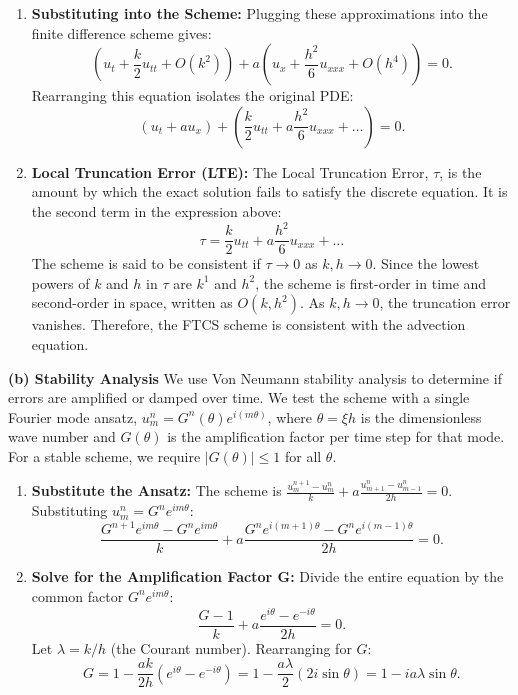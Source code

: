 \begin{solution}
\begin{enumerate}
    \item \textbf{Substituting into the Scheme:}
    Plugging these approximations into the finite difference scheme gives:
    \[ \left( u_t + \frac{k}{2} u_{tt} + O(k^2) \right) + a \left( u_x + \frac{h^2}{6} u_{xxx} + O(h^4) \right) = 0. \]
    Rearranging this equation isolates the original PDE:
    \[ (u_t + a u_x) + \left( \frac{k}{2} u_{tt} + a \frac{h^2}{6} u_{xxx} + \dots \right) = 0. \]
    
    \item \textbf{Local Truncation Error (LTE):}
    The Local Truncation Error, $\tau$, is the amount by which the exact solution fails to satisfy the discrete equation. It is the second term in the expression above:
    \[ \tau = \frac{k}{2} u_{tt} + a \frac{h^2}{6} u_{xxx} + \dots \]
    The scheme is said to be consistent if $\tau \to 0$ as $k, h \to 0$. Since the lowest powers of $k$ and $h$ in $\tau$ are $k^1$ and $h^2$, the scheme is first-order in time and second-order in space, written as $O(k, h^2)$. As $k,h \to 0$, the truncation error vanishes. Therefore, the FTCS scheme is consistent with the advection equation.
\end{enumerate}

\textbf{(b) Stability Analysis}
We use Von Neumann stability analysis to determine if errors are amplified or damped over time. We test the scheme with a single Fourier mode ansatz, $u_m^n = G^n(\theta) e^{i(m\theta)}$, where $\theta = \xi h$ is the dimensionless wave number and $G(\theta)$ is the amplification factor per time step for that mode. For a stable scheme, we require $|G(\theta)| \le 1$ for all $\theta$.

\begin{enumerate}
    \item \textbf{Substitute the Ansatz:}
    The scheme is $\frac{u_{m}^{n+1}-u_{m}^{n}}{k}+a\frac{u_{m+1}^{n}-u_{m-1}^{n}}{2h}=0$. Substituting $u_m^n = G^n e^{im\theta}$:
    \[ \frac{G^{n+1}e^{im\theta} - G^n e^{im\theta}}{k} + a \frac{G^n e^{i(m+1)\theta} - G^n e^{i(m-1)\theta}}{2h} = 0. \]
    
    \item \textbf{Solve for the Amplification Factor G:}
    Divide the entire equation by the common factor $G^n e^{im\theta}$:
    \[ \frac{G - 1}{k} + a \frac{e^{i\theta} - e^{-i\theta}}{2h} = 0. \]
    Let $\lambda = k/h$ (the Courant number). Rearranging for $G$:
    \[ G = 1 - \frac{ak}{2h} (e^{i\theta} - e^{-i\theta}) = 1 - \frac{a\lambda}{2} (2i \sin\theta) = 1 - i a \lambda \sin\theta. \]
    

\end{enumerate}
\end{solution}
